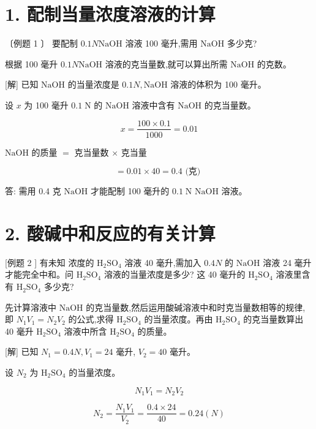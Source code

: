 \documentclass[10pt]{article}
\begin{document}
\section*{1. 配制当量浓度溶液的计算}

〔例题 1 〕 要配制 \({0.1N}\mathrm{{NaOH}}\) 溶液 100 毫升,需用 \(\mathrm{{NaOH}}\) 多少克?

根据 100 毫升 \({0.1N}\mathrm{{NaOH}}\) 溶液的克当量数,就可以算出所需 \(\mathrm{{NaOH}}\) 的克数。

[解] 已知 \(\mathrm{{NaOH}}\) 的当量浓度是 \({0.1N},\mathrm{{NaOH}}\) 溶液的体积为 100 毫升。

设 \(x\) 为 100 毫升 \({0.1}\mathrm{\;N}\) 的 \(\mathrm{{NaOH}}\) 溶液中含有 \(\mathrm{{NaOH}}\) 的克当量数。

\[
x = \frac{{100} \times {0.1}}{1000} = {0.01}
\]

\(\mathrm{{NaOH}}\) 的质量 \(=\) 克当量数 \(\times\) 克当量

\[
= {0.01} \times {40} = {0.4}\text{ (克) }
\]

答: 需用 0.4 克 \(\mathrm{{NaOH}}\) 才能配制 100 毫升的 \({0.1}\mathrm{\;N}\) \(\mathrm{{NaOH}}\) 溶液。

\section*{2. 酸碱中和反应的有关计算}

[例题 2 ] 有未知 浓度的 \({\mathrm{H}}_{2}{\mathrm{{SO}}}_{4}\) 溶液 40 毫升,需加入 \({0.4N}\) 的 \(\mathrm{{NaOH}}\) 溶液 24 毫升才能完全中和。问 \({\mathrm{H}}_{2}{\mathrm{{SO}}}_{4}\) 溶液的当量浓度是多少? 这 40 毫升的 \({\mathrm{H}}_{2}{\mathrm{{SO}}}_{4}\) 溶液里含有 \({\mathrm{H}}_{2}{\mathrm{{SO}}}_{4}\) 多少克?

先计算溶液中 \(\mathrm{{NaOH}}\) 的克当量数,然后运用酸碱溶液中和时克当量数相等的规律,即 \({N}_{1}{V}_{1} = {N}_{2}{V}_{2}\) 的公式,求得 \({\mathrm{H}}_{2}{\mathrm{{SO}}}_{4}\) 的当量浓度。再由 \({\mathrm{H}}_{2}{\mathrm{{SO}}}_{4}\) 的克当量数算出 40 毫升 \({\mathrm{H}}_{2}{\mathrm{{SO}}}_{4}\) 溶液中所含 \({\mathrm{H}}_{2}{\mathrm{{SO}}}_{4}\) 的质量。

[解] 已知 \({N}_{1} = {0.4N},{V}_{1} = {24}\) 毫升, \({V}_{2} = {40}\) 毫升。

设 \({N}_{2}\) 为 \({\mathrm{H}}_{2}{\mathrm{{SO}}}_{4}\) 的当量浓度。

\[
{N}_{1}{V}_{1} = {N}_{2}{V}_{2}
\]

\[
{N}_{2} = \frac{{N}_{1}{V}_{1}}{{V}_{2}} = \frac{{0.4} \times {24}}{40} = {0.24}\left( N\right)
\]
\end{document}
